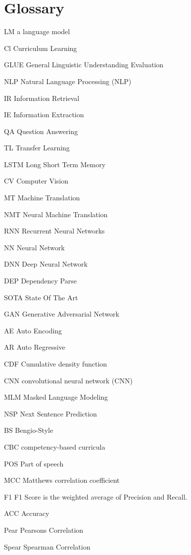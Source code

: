 \documentclass [11pt, proquest] {uwthesis}[2020/12/20]
\begin{document}
\chapter*{Glossary}   
\begin{glossary}
\item[LM] a language model
\item[Cl]Curriculum Learning
\item[GLUE] General Linguistic Understanding Evaluation
\item[NLP] Natural Language Processing (NLP)
\item[IR] Information Retrieval
\item[IE] Information Extraction
\item[QA] Question Answering
\item[TL] Transfer Learning
\item[LSTM] Long Short Term Memory
\item[CV] Computer Vision
\item[MT] Machine Translation
\item[NMT] Neural Machine Translation
\item[RNN]Recurrent Neural Networks 
\item[NN] Neural Network
\item[DNN] Deep Neural Network
\item[DEP] Dependency Parse
\item[SOTA] State Of The Art
\item[GAN] Generative Adversarial Network
\item[AE] Auto Encoding
\item[AR] Auto Regressive
\item[CDF] Cumulative density function
\item[CNN] convolutional neural network (CNN) 
\item[MLM] Masked Language Modeling
\item[NSP] Next Sentence Prediction
\item[BS] Bengio-Style
\item[CBC] competency-based curricula
\item[POS] Part of speech
\item[MCC] Matthews correlation coefficient 
\item[F1]  F1 Score is the weighted average of Precision and Recall.
\item[ACC] Accuracy
\item[Pear] Pearsons Correlation
\item[Spear] Spearman Correlation
\end{glossary}
\end{document}
